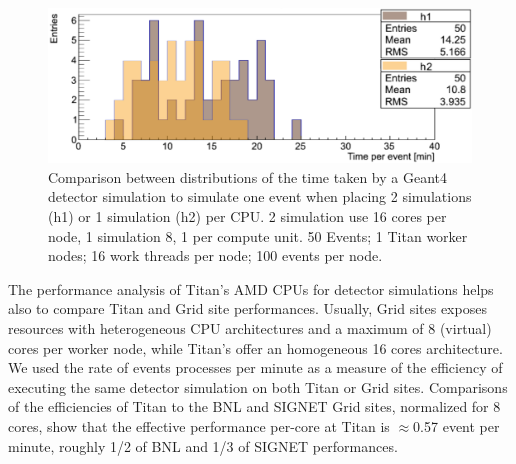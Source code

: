 \begin{figure}[htp]
    \includegraphics[clip,width=\columnwidth]{figures/tx8_tx16_comparison_vsquashed.pdf}
    \caption{Comparison between distributions of the time taken by a Geant4
    detector simulation to simulate one event when placing 2 simulations (h1) or
    1 simulation (h2) per CPU. 2 simulation use 16 cores per node, 1 simulation
    8, 1 per compute unit. 50 Events; 1 Titan worker nodes; 16 work threads per
    node; 100 events per node.}
\label{fig:comparison-8-16cores}
\end{figure}

The performance analysis of Titan's AMD CPUs for detector simulations helps also
to compare Titan and Grid site performances. Usually, Grid sites exposes
resources with heterogeneous CPU architectures and a maximum of 8 (virtual)
cores per worker node, while Titan's offer an homogeneous 16 cores architecture.
We used the rate of events processes per minute as a measure of the efficiency
of executing the same detector simulation on both Titan or Grid sites.
Comparisons of the efficiencies of Titan to  the BNL and SIGNET Grid sites,
normalized for 8 cores, show that the effective performance per-core at Titan is
$\approx$0.57 event per minute, roughly 1/2 of BNL and  1/3 of SIGNET
performances.



